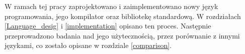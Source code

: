 W ramach tej pracy zaprojektowano i zaimplementowano nowy język programowania, jego kompilator oraz bibliotekę standardową.
W rozdziałach \ref{Language_desig} i \ref{implementation} opisano ten proces.
Następnie przeprowadzono badania nad jego użytecznością, przez porównanie z innymi językami, co zostało opisane w rozdziale \ref{comparison}.

